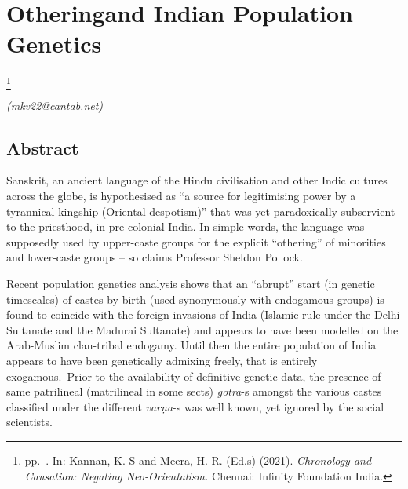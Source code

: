 
\chapter{\hspace{7.32cm} \hfill Othering\break and Indian Population Genetics}\label{chapter10}

\footnote{pp.~\pageref{chapter10}\enginline{--}\pageref{chapter10-end}. In: Kannan, K. S and Meera, H. R. (Ed.s) (2021). \textit{Chronology and Causation: Negating Neo-Orientalism.} Chennai: Infinity Foundation India.}


\begin{flushright}
\textit{(mkv22@cantab.net)}
\end{flushright}

\setcounter{endnote}{0}

\section*{Abstract}

Sanskrit, an ancient language of the Hindu civilisation and other Indic cultures across the globe, is hypothesised as “a source for legitimising power by a tyrannical kingship (Oriental despotism)” that was yet paradoxically subservient to the priesthood, in pre-colonial India. In simple words, the language was supposedly used by upper-caste groups for the explicit “othering” of minorities and lower-caste groups – so claims Professor Sheldon Pollock.

Recent population genetics analysis shows that an “abrupt” start (in genetic timescales) of castes-by-birth (used synonymously with endogamous groups) is found to coincide with the foreign invasions of India (Islamic rule under the Delhi Sultanate and the Madurai Sultanate) and appears to have been modelled on the Arab-Muslim clan-tribal endogamy. Until then the entire population of India appears to have been genetically admixing freely, that is entirely exogamous.~Prior to the availability of definitive genetic data, the presence of same patrilineal (matrilineal in some sects) \textit{gotra}-s amongst the various castes classified under the different \textit{varṇa}-s was well known, yet ignored by the social scientists.

